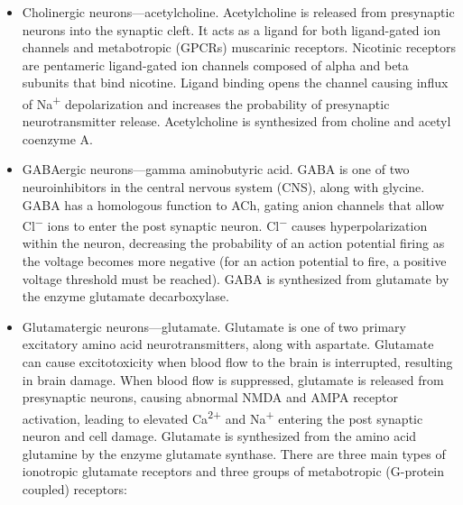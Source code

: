 \begin{itemize}
\tightlist
\item
  Cholinergic neurons---acetylcholine. Acetylcholine is released from presynaptic neurons into the synaptic cleft. It acts as a ligand for both ligand-gated ion channels and metabotropic (GPCRs) muscarinic receptors. Nicotinic receptors are pentameric ligand-gated ion channels composed of alpha and beta subunits that bind nicotine. Ligand binding opens the channel causing influx of Na\textsuperscript{+} depolarization and increases the probability of presynaptic neurotransmitter release. Acetylcholine is synthesized from choline and acetyl coenzyme A.
\item
  GABAergic neurons---gamma aminobutyric acid. GABA is one of two neuroinhibitors in the central nervous system (CNS), along with glycine. GABA has a homologous function to ACh, gating anion channels that allow Cl\textsuperscript{−} ions to enter the post synaptic neuron. Cl\textsuperscript{−} causes hyperpolarization within the neuron, decreasing the probability of an action potential firing as the voltage becomes more negative (for an action potential to fire, a positive voltage threshold must be reached). GABA is synthesized from glutamate by the enzyme glutamate decarboxylase.
\item
  Glutamatergic neurons---glutamate. Glutamate is one of two primary excitatory amino acid neurotransmitters, along with aspartate. Glutamate can cause excitotoxicity when blood flow to the brain is interrupted, resulting in brain damage. When blood flow is suppressed, glutamate is released from presynaptic neurons, causing abnormal NMDA and AMPA receptor activation, leading to elevated Ca\textsuperscript{2+} and Na\textsuperscript{+} entering the post synaptic neuron and cell damage. Glutamate is synthesized from the amino acid glutamine by the enzyme glutamate synthase. There are three main types of ionotropic glutamate receptors and three groups of metabotropic (G-protein coupled) receptors:


\end{itemize}
